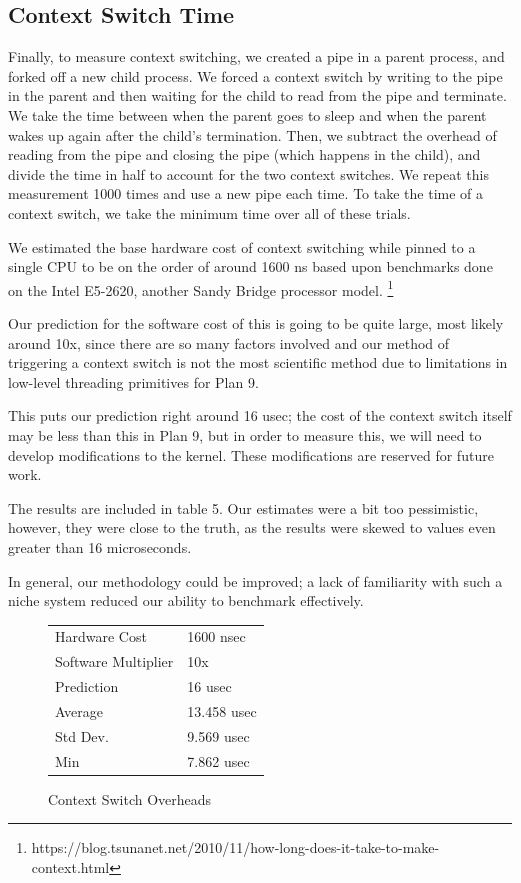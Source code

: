 \documentclass[letterpaper,twocolumn,10pt]{article}
\begin{document}
\subsection{Context Switch Time}

Finally, to measure context switching, we created a pipe in a parent process,
and forked off a new child process. We forced a context switch by writing to
the pipe in the parent and then waiting for the child to read from the pipe
and terminate. We take the time between when the parent goes to sleep and when
the parent wakes up again after the child's termination. Then, we subtract
the overhead of reading from the pipe and closing the pipe (which happens in
the child), and divide the time in half to account for the two context switches.
We repeat this measurement 1000 times and use a new pipe each time. To take
the time of a context switch, we take the minimum time over all of these trials.

We estimated the base hardware cost of context switching while pinned to a single CPU to
be on the order of around 1600 ns based upon benchmarks done on the Intel E5-2620, another
Sandy Bridge processor model. \footnote{https://blog.tsunanet.net/2010/11/how-long-does-it-take-to-make-context.html}

Our prediction for the software cost of this is going to be quite large, most likely around 10x, since there
are so many factors involved and our method of triggering a context switch is not the most scientific 
method due to limitations in low-level threading primitives for Plan 9. 

This puts our prediction right around 16 usec; the cost of the context switch itself may be less than 
this in Plan 9, but in order to measure this, we will need to develop modifications to the kernel. 
These modifications are reserved for future work.

The results are included in table 5. Our estimates were a bit too pessimistic, however, they were close 
to the truth, as the results were skewed to values even greater than 16 microseconds. 

In general, our methodology could be improved; a lack of familiarity with such a niche system reduced our ability to benchmark effectively. 

\begin{figure}
	\centering
\begin{tabular}{ll}
Hardware Cost  & 1600 nsec  \\
Software Multiplier  & 10x   \\
Prediction  & 16 usec    \\
Average  & 13.458 usec    \\
Std Dev. & 9.569 usec     \\
Min      & 7.862 usec   
\end{tabular}
\caption{Context Switch Overheads}
\label{tab:conswitchoverheads}
\end{figure}
\end{document}
